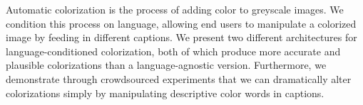 Automatic colorization is the process of adding color to greyscale images. We condition this process on language, allowing end users to manipulate a colorized image by feeding in different captions. We present two different architectures for language-conditioned colorization, both of which produce more accurate and plausible colorizations than a language-agnostic version. Furthermore, we demonstrate through crowdsourced experiments that we can dramatically alter colorizations simply by manipulating descriptive color words in captions.
